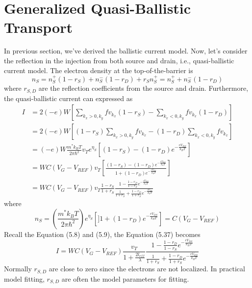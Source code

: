 \section{Generalized Quasi-Ballistic Transport}
In previous section, we've derived the ballistic current model. Now, let's consider the reflection in the injection from both source and drain, i.e., quasi-ballistic current model. The electron density at the top-of-the-barrier is \begin{equation}
    n_{S} = n_{S}^{+}(1-r_{S}) + n_{S}^{-}(1-r_{D}) + r_{S}n_{S}^{+} = n_{S}^{+} + n_{S}^{-}(1-r_{D})
\end{equation} where $r_{S,D}$ are the reflection coefficients from the source and drain. Furthermore, the quasi-ballistic current can expressed as \begin{align}
    I& = 2(-e)W\left[\sum_{k_{x}>0,k_{y}}{fv_{k_{x}}(1-r_{S})}-\sum_{k_{x}<0,k_{y}}{fv_{k_{x}}(1-r_{D})}\right]\nonumber\\
    & = 2(-e)W\left[(1-r_{S})\sum_{k_{x}>0,k_{y}}{fv_{k_{x}}}-(1-r_{D})\sum_{k_{x}<0,k_{y}}{fv_{k_{x}}}\right]\nonumber\\
    & = (-e)W\frac{m^{*}k_{B}T}{2\pi\hbar^{2}}v_{T}e^{\eta_{S}}\left[(1-r_{S})-(1-r_{D})e^{-\frac{eV_{DS}}{k_{B}T}}\right]\nonumber\\
    & = WC(V_{G}-V_{REF})v_{T}\left[\frac{(1-r_{S})-(1-r_{D})e^{-\frac{eV_{DS}}{k_{B}T}}}{1+(1-r_{D})e^{-\frac{eV_{DS}}{k_{B}T}}}\right]\nonumber\\
    & = WC(V_{G}-V_{REF})v_{T}\frac{1-r_{S}}{1+r_{S}}\frac{1-\frac{1-r_{D}}{1-r_{S}}e^{-\frac{eV_{DS}}{k_{B}T}}}{\frac{1}{1+r_{S}}+\frac{1-r_{D}}{1+r_{S}}e^{-\frac{eV_{DS}}{k_{B}T}}}
\end{align} where \begin{equation}
    n_{S} = \left(\frac{m^{*}k_{B}T}{2\pi\hbar^{2}}\right)e^{\eta_{S}}\left[]1+(1-r_{D})e^{-\frac{eV_{DS}}{k_{B}T}}\right] = C(V_{G}-V_{REF})
\end{equation} Recall the Equation (5.8) and (5.9), the Equation (5.37) becomes \begin{equation}
    I =  WC(V_{G}-V_{REF})\frac{v_{T}}{1+\frac{2l_{eff}}{\lambda}}\frac{1-\frac{1-r_{D}}{1-r_{S}}e^{-\frac{eV_{DS}}{k_{B}T}}}{\frac{1}{1+r_{S}}+\frac{1-r_{D}}{1+r_{S}}e^{-\frac{eV_{DS}}{k_{B}T}}}
\end{equation} Normally $r_{S,D}$ are close to zero since the electrons are not localized. In practical model fitting, $r_{S,D}$ are often the model parameters for fitting.
